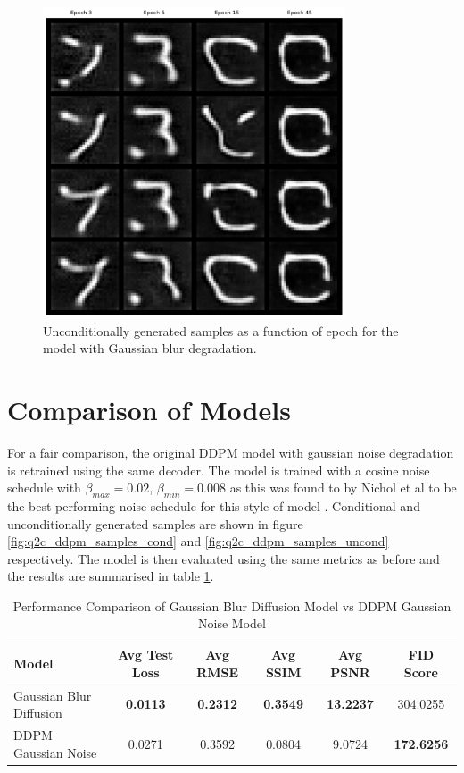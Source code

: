 \documentclass[11pt]{article}
\begin{document}
\begin{figure}[H]
    \centering
    \includegraphics[width=0.8\textwidth]{figs/q2b_blur_uncond_samples.png}
    \caption{Unconditionally generated samples as a function of epoch for the model with Gaussian blur degradation.}
    \label{fig:q2b_unconditional_samples}
\end{figure}

\section{Comparison of Models}
For a fair comparison, the original DDPM model with gaussian noise degradation is retrained using the same decoder. The model is trained with a cosine noise schedule with $\beta_{max} = 0.02$, $\beta_{min} = 0.008$ as this was found to by Nichol et al to be the best performing noise schedule for this style of model \cite{nichol2021improved}. Conditional and unconditionally generated samples are shown in figure \ref{fig:q2c_ddpm_samples_cond} and \ref{fig:q2c_ddpm_samples_uncond} respectively. The model is then evaluated using the same metrics as before and the results are summarised in table \ref{tab:q2c_model_comparison}.
\begin{table}[h]
    \centering
    \begin{tabular}{lccccc}
    \hline
    Model & Avg Test Loss & Avg RMSE & Avg SSIM & Avg PSNR & FID Score \\
    \hline
    Gaussian Blur Diffusion & \textbf{0.0113} & \textbf{0.2312} & \textbf{0.3549} & \textbf{13.2237} & 304.0255 \\
    DDPM Gaussian Noise & 0.0271 & 0.3592 & 0.0804 & 9.0724 & \textbf{172.6256} \\
    \hline
    \end{tabular}
    \caption{Performance Comparison of Gaussian Blur Diffusion Model vs DDPM Gaussian Noise Model}
    \label{tab:q2c_model_comparison}
\end{table}
\end{document}
